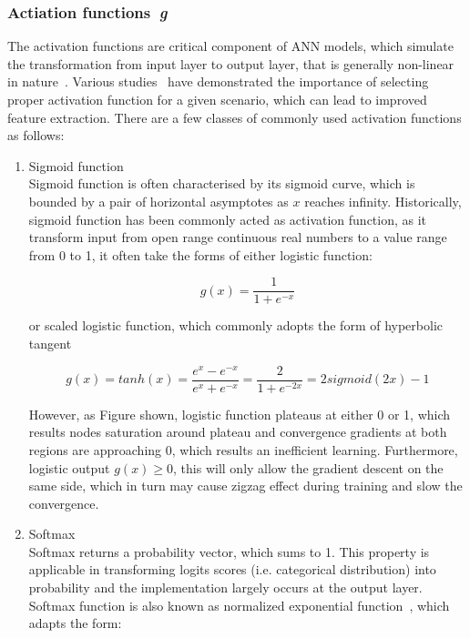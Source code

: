 \subsubsection{Actiation functions~\textit{g}}
The activation functions are critical component of ANN models, which simulate the transformation from input layer to output layer, that is generally non-linear in nature~\cite{LeCun_2015}. Various studies~\cite{Bengio_2012,Singh_2013} have demonstrated the importance of selecting proper activation function for a given scenario, which can lead to improved feature extraction. There are a few classes of commonly used activation functions as follows:
\begin{enumerate}
\item Sigmoid function \\
Sigmoid function is often characterised by its sigmoid curve, which is bounded by a pair of horizontal asymptotes as $x$ reaches infinity. Historically, sigmoid function has been commonly acted as activation function, as it transform input from open range continuous real numbers to a value range from 0 to 1, it often take the forms of either logistic function:

\begin{equation}
    g(x) = \frac{1} {1+ e^{-x}}
\end{equation}

or scaled logistic function, which commonly adopts the form of hyperbolic tangent

\begin{equation}
    g(x) = tanh(x) = \frac{e^x-e^{-x}} {e^x + e^{-x}} = \frac {2} {1 + e^{-2x}} = 2 sigmoid(2x) - 1
\end{equation}

However, as Figure shown, logistic function plateaus at either 0 or 1, which results nodes saturation around plateau and convergence gradients at both regions are approaching 0, which results an inefficient learning. Furthermore, logistic output $g(x) \geq 0$, this will only allow the gradient descent on the same side, which in turn may cause zigzag effect during training and slow the convergence. 

\item Softmax \\
Softmax returns a probability vector, which sums to 1. This property is applicable in transforming logits scores (i.e.  categorical distribution) into probability and the implementation largely occurs at the output layer. Softmax function is also known as normalized exponential function~\cite{Howard_2007}, which adapts the form: 


\end{enumerate}
